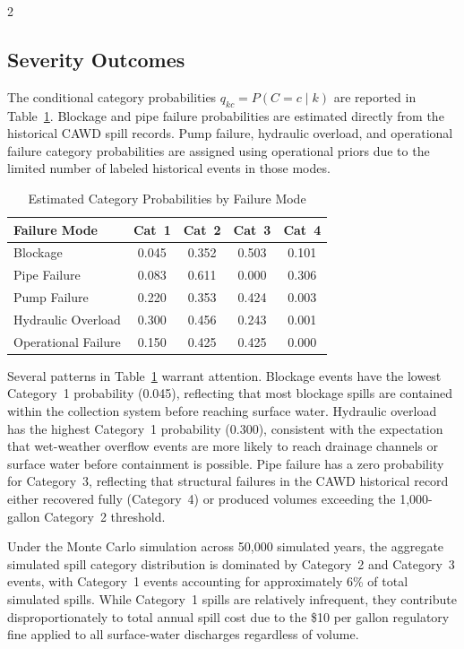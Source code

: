 \documentclass[10pt]{article}
\begin{document}
\begin{multicols}{2}
\subsection{Severity Outcomes}
 
The conditional category probabilities $q_{kc} = P(C = c \mid k)$
are reported in Table~\ref{tab:severity-probs}. Blockage and pipe
failure probabilities are estimated directly from the historical
CAWD spill records. Pump failure, hydraulic overload, and operational
failure category probabilities are assigned using operational priors
due to the limited number of labeled historical events in those modes.
 
\begin{table}[H]
\centering
\caption{Estimated Category Probabilities by Failure Mode}
\label{tab:severity-probs}
\begin{tabular}{lcccc}
\toprule
\textbf{Failure Mode} & \textbf{Cat~1} & \textbf{Cat~2}
  & \textbf{Cat~3} & \textbf{Cat~4} \\
\midrule
Blockage            & 0.045 & 0.352 & 0.503 & 0.101 \\
Pipe Failure        & 0.083 & 0.611 & 0.000 & 0.306 \\
Pump Failure        & 0.220 & 0.353 & 0.424 & 0.003 \\
Hydraulic Overload  & 0.300 & 0.456 & 0.243 & 0.001 \\
Operational Failure & 0.150 & 0.425 & 0.425 & 0.000 \\
\bottomrule
\end{tabular}
\end{table}
 
Several patterns in Table~\ref{tab:severity-probs} warrant attention.
Blockage events have the lowest Category~1 probability (0.045),
reflecting that most blockage spills are contained within the
collection system before reaching surface water. Hydraulic overload
has the highest Category~1 probability (0.300), consistent with the
expectation that wet-weather overflow events are more likely to
reach drainage channels or surface water before containment is
possible. Pipe failure has a zero probability for Category~3,
reflecting that structural failures in the CAWD historical record
either recovered fully (Category~4) or produced volumes exceeding
the 1{,}000-gallon Category~2 threshold.
 
Under the Monte Carlo simulation across 50{,}000 simulated years,
the aggregate simulated spill category distribution is dominated by
Category~2 and Category~3 events, with Category~1 events accounting
for approximately 6\% of total simulated spills. While Category~1
spills are relatively infrequent, they contribute disproportionately
to total annual spill cost due to the \$10 per gallon regulatory fine
applied to all surface-water discharges regardless of volume.
 

\end{multicols}
\end{document}
